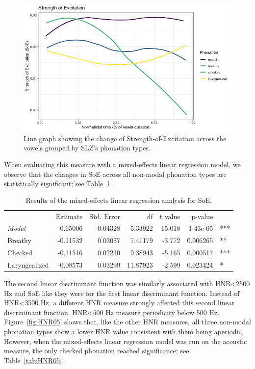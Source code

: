 \documentclass[12pt, letterpaper]{article}
\providecommand{\lsptoprule}{\midrule\toprule}
\providecommand{\lspbottomrule}{\bottomrule\midrule}
\begin{document}
\begin{figure}[!h]
	\centering
	\includegraphics[width=.75\linewidth]{Images/SoE.png}
	\caption{Line graph showing the change of Strength-of-Excitation across the vowels grouped by SLZ's phonation types.}
	\label{fig:SOE}
\end{figure}

When evaluating this measure with a mixed-effects linear regression model, we observe that the changes in SoE across all non-modal phonation types are statistically significant; see Table~\ref{tab:SOE}. 

\begin{table}[!h]
    \centering
    \caption{Results of the mixed-effects linear regression analysis for SoE.}
    \label{tab:SOE}
    \begin{tabular}{lrrrrrl}
	\lsptoprule
					&  Estimate  & Std. Error & df & t value & p-value & \\
        \textit{Modal}  &   0.65006  &  0.04328 &  5.33922 & 15.018 & 1.43e-05 & *** \\  
  	Breathy   		&  -0.11532  &  0.03057 &  7.41179 & -3.772 & 0.006265 & ** \\
	Checked    		&  -0.11516  &  0.02230 &  9.38943 & -5.165 & 0.000517 & *** \\
	Laryngealized	&  -0.08573  &  0.03299 & 11.87923 & -2.599 & 0.023424 & * \\
    \lspbottomrule
    \end{tabular}
\end{table}

The second linear discriminant function was similarly associated with HNR\textless 2500 Hz and SoE like they were for the first linear discriminant function. Instead of HNR\textless 3500 Hz, a different HNR measure strongly affected this second linear discriminant function. HNR\textless 500 Hz measure periodicity below 500 Hz. Figure~\ref{fig:HNR05} shows that, like the other HNR measures, all three non-modal phonation types show a lower HNR value consistent with them being aperiodic. However, when the mixed-effects linear regression model was run on the acoustic measure, the only checked phonation reached significance; see Table~\ref{tab:HNR05}. 
\end{document}
